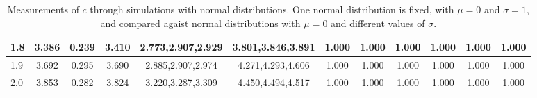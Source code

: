 \begin{table*}[h!]
\begin{center}
\begin{tabular}{| l | c | c | c | c | c | c | c | c | c | c | c |}
1.8 & 3.386 & 0.239 & 3.410 & 2.773,2.907,2.929 & 3.801,3.846,3.891  & 1.000  & 1.000  & 1.000  & 1.000  & 1.000  & 1.000 \\\hline
1.9 & 3.692 & 0.295 & 3.690 & 2.885,2.907,2.974 & 4.271,4.293,4.606  & 1.000  & 1.000  & 1.000  & 1.000  & 1.000  & 1.000 \\\hline
2.0 & 3.853 & 0.282 & 3.824 & 3.220,3.287,3.309 & 4.450,4.494,4.517  & 1.000  & 1.000  & 1.000  & 1.000  & 1.000  & 1.000 \\\hline
\end{tabular}
\caption{Measurements of $c$ through simulations
with normal distributions.
One normal distribution is fixed, with $\mu=0$ and $\sigma=1$,
and compared agaist normal distributions with $\mu=0$
and different values of $\sigma$.}
\end{center}
\end{table*}